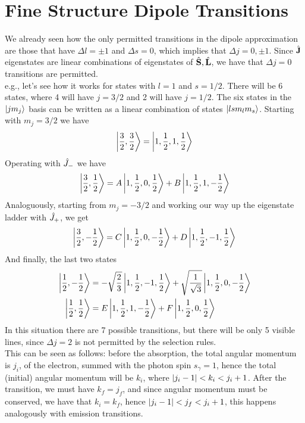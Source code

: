 \documentclass[../qm.tex]{subfiles}
\begin{document}
	\section{Fine Structure Dipole Transitions}
	We already seen how the only permitted transitions in the dipole approximation are those that have $\Delta l=\pm1$ and $\Delta s=0$, which implies that $\Delta j=0,\pm1$. Since $\hat{\mathbf{J}}$ eigenstates are linear combinations of eigenstates of $\hat{\mathbf{S}},\hat{\mathbf{L}}$, we have that $\Delta j=0$ transitions are permitted.\\
	e.g., let's see how it works for states with $l=1$ and $s=1/2$. There will be 6 states, where 4 will have $j=3/2$ and 2 will have $j=1/2$. The six states in the $\ket{jm_j}$ basis can be written as a linear combination of states $\ket{lsm_lm_s}$. Starting with $m_j=3/2$ we have
	\begin{equation*}
		\ket{\frac{3}{2},\frac{3}{2}}=\ket{1,\frac{1}{2},1,\frac{1}{2}}
	\end{equation*}
	Operating with $\hat{J}_{-}$ we have
	\begin{equation*}
		\ket{\frac{3}{2},\frac{1}{2}}=A\ket{1,\frac{1}{2},0,\frac{1}{2}}+B\ket{1,\frac{1}{2},1,-\frac{1}{2}}
	\end{equation*}
	Analoguously, starting from $m_j=-3/2$ and working our way up the eigenstate ladder with $\hat{J}_{+}$, we get
	\begin{equation*}
		\ket{\frac{3}{2},-\frac{1}{2}}=C\ket{1,\frac{1}{2},0,-\frac{1}{2}}+D\ket{1,\frac{1}{2},-1,\frac{1}{2}}
	\end{equation*}
	And finally, the last two states
	\begin{equation*}
		\begin{aligned}
			\ket{\frac{1}{2},-\frac{1}{2}}&=-\sqrt{\frac{2}{3}}\ket{1,\frac{1}{2},-1,\frac{1}{2}}+\sqrt{\frac{1}{\sqrt{3}}}\ket{1,\frac{1}{2},0,-\frac{1}{2}}\\
			\ket{\frac{1}{2},\frac{1}{2}}&=E\ket{1,\frac{1}{2},1,-\frac{1}{2}}+F\ket{1,\frac{1}{2},0,\frac{1}{2}}
		\end{aligned}
	\end{equation*}
	In this situation there are 7 possible transitions, but there will be only 5 visible lines, since $\Delta j=2$ is not permitted by the selection rules.\\
	This can be seen as follows: before the absorption, the total angular momentum is $j_i$, of the electron, summed with the photon spin $s_{\gamma}=1$, hence the total (initial) angular momentum will be $k_i$, where $\abs{j_i-1}<k_i<j_i+1$. After the transition, we must have $k_f=j_f$, and since angular momentum must be conserved, we have that $k_i=k_f$, hence $\abs{j_i-1}<j_f<j_i+1$, this happens analogously with emission transitions.
\end{document}
